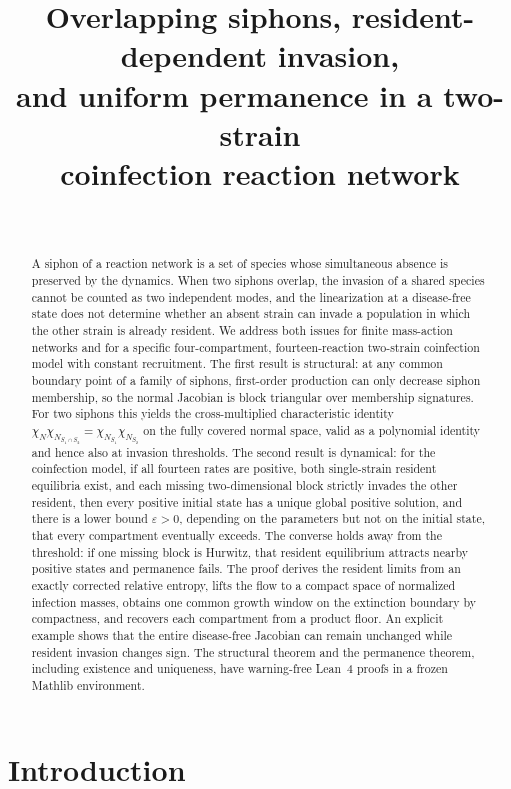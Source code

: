 \documentclass[11pt,a4paper]{article}
\title{Overlapping siphons, resident-dependent invasion,\\
and uniform permanence in a two-strain\\ coinfection reaction network}
\author{\PaperAuthor\\[2pt] {\small\itshape \PaperAffiliation}}
\date{\PaperDate}
\theoremstyle{plain}
\theoremstyle{definition}
\theoremstyle{remark}
\newcommand{\ch}{\chi}
\newcommand{\eps}{\varepsilon}
\begin{document}
\maketitle

\begin{abstract}
A siphon of a reaction network is a set of species whose simultaneous absence is preserved by the dynamics. When two siphons overlap, the invasion of a shared species cannot be counted as two independent modes, and the linearization at a disease-free state does not determine whether an absent strain can invade a population in which the other strain is already resident. We address both issues for finite mass-action networks and for a specific four-compartment, fourteen-reaction two-strain coinfection model with constant recruitment.
The first result is structural: at any common boundary point of a family of siphons, first-order production can only decrease siphon membership, so the normal Jacobian is block triangular over membership signatures. For two siphons this yields the cross-multiplied characteristic identity $\ch_N\ch_{N_{S_1\cap S_2}}=\ch_{N_{S_1}}\ch_{N_{S_2}}$ on the fully covered normal space, valid as a polynomial identity and hence also at invasion thresholds.
The second result is dynamical: for the coinfection model, if all fourteen rates are positive, both single-strain resident equilibria exist, and each missing two-dimensional block strictly invades the other resident, then every positive initial state has a unique global positive solution, and there is a lower bound $\eps>0$, depending on the parameters but not on the initial state, that every compartment eventually exceeds. The converse holds away from the threshold: if one missing block is Hurwitz, that resident equilibrium attracts nearby positive states and permanence fails.
The proof derives the resident limits from an exactly corrected relative entropy, lifts the flow to a compact space of normalized infection masses, obtains one common growth window on the extinction boundary by compactness, and recovers each compartment from a product floor. An explicit example shows that the entire disease-free Jacobian can remain unchanged while resident invasion changes sign. The structural theorem and the permanence theorem, including existence and uniqueness, have warning-free Lean~4 proofs in a frozen Mathlib environment.
\end{abstract}

\section{Introduction}\label{sec:intro}
\end{document}
